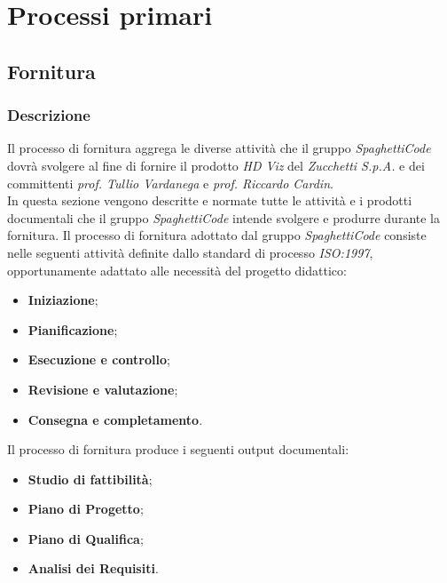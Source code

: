 \section{Processi primari}
\label{sec:processi_primari}

\subsection{Fornitura}
\label{sub:fornitura}

\subsubsection{Descrizione}

Il processo di fornitura aggrega le diverse attività che il gruppo \emph{SpaghettiCode} dovrà svolgere al fine di fornire il prodotto
\emph{HD Viz} del  \emph{Zucchetti S.p.A.} e dei committenti \emph{prof. Tullio Vardanega} e
\emph{prof. Riccardo Cardin}.\\

In questa sezione vengono descritte e normate tutte le attività e i prodotti documentali che il gruppo \emph{SpaghettiCode} intende svolgere
 e produrre durante la fornitura.
Il processo di fornitura adottato dal gruppo \emph{SpaghettiCode} consiste nelle seguenti attività definite dallo standard di processo
\emph{ISO:1997}, opportunamente adattato alle necessità del progetto didattico:
\begin{itemize}
    \item \textbf{Iniziazione};
    \item \textbf{Pianificazione};
    \item \textbf{Esecuzione e controllo};
    \item \textbf{Revisione e valutazione};
    \item \textbf{Consegna e completamento}.
\end{itemize}

Il processo di fornitura produce i seguenti output documentali:
\begin{itemize}
    \item \textbf{Studio di fattibilità};
	\item \textbf{Piano di Progetto};
	\item \textbf{Piano di Qualifica};
    \item \textbf{Analisi dei Requisiti}.

\end{itemize}


